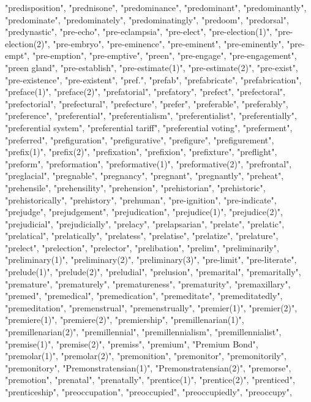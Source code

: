 "predisposition",
"prednisone",
"predominance",
"predominant",
"predominantly",
"predominate",
"predominately",
"predominatingly",
"predoom",
"predorsal",
"predynastic",
"pre-echo",
"pre-eclampsia",
"pre-elect",
"pre-election(1)",
"pre-election(2)",
"pre-embryo",
"pre-eminence",
"pre-eminent",
"pre-eminently",
"pre-empt",
"pre-emption",
"pre-emptive",
"preen",
"pre-engage",
"pre-engagement",
"preen gland",
"pre-establish",
"pre-estimate(1)",
"pre-estimate(2)",
"pre-exist",
"pre-existence",
"pre-existent",
"pref.",
"prefab",
"prefabricate",
"prefabrication",
"preface(1)",
"preface(2)",
"prefatorial",
"prefatory",
"prefect",
"prefectoral",
"prefectorial",
"prefectural",
"prefecture",
"prefer",
"preferable",
"preferably",
"preference",
"preferential",
"preferentialism",
"preferentialist",
"preferentially",
"preferential system",
"preferential tariff",
"preferential voting",
"preferment",
"preferred",
"prefiguration",
"prefigurative",
"prefigure",
"prefigurement",
"prefix(1)",
"prefix(2)",
"prefixation",
"prefixion",
"prefixture",
"preflight",
"preform",
"preformation",
"preformative(1)",
"preformative(2)",
"prefrontal",
"preglacial",
"pregnable",
"pregnancy",
"pregnant",
"pregnantly",
"preheat",
"prehensile",
"prehensility",
"prehension",
"prehistorian",
"prehistoric",
"prehistorically",
"prehistory",
"prehuman",
"pre-ignition",
"pre-indicate",
"prejudge",
"prejudgement",
"prejudication",
"prejudice(1)",
"prejudice(2)",
"prejudicial",
"prejudicially",
"prelacy",
"prelapsarian",
"prelate",
"prelatic",
"prelatical",
"prelatically",
"prelatess",
"prelatise",
"prelatize",
"prelature",
"prelect",
"prelection",
"prelector",
"prelibation",
"prelim",
"preliminarily",
"preliminary(1)",
"preliminary(2)",
"preliminary(3)",
"pre-limit",
"pre-literate",
"prelude(1)",
"prelude(2)",
"preludial",
"prelusion",
"premarital",
"premaritally",
"premature",
"prematurely",
"prematureness",
"prematurity",
"premaxillary",
"premed",
"premedical",
"premedication",
"premeditate",
"premeditatedly",
"premeditation",
"premenstrual",
"premenstrually",
"premier(1)",
"premier(2)",
"premiere(1)",
"premiere(2)",
"premiership",
"premillenarian(1)",
"premillenarian(2)",
"premillennial",
"premillennialism",
"premillennialist",
"premise(1)",
"premise(2)",
"premiss",
"premium",
"Premium Bond",
"premolar(1)",
"premolar(2)",
"premonition",
"premonitor",
"premonitorily",
"premonitory",
"Premonstratensian(1)",
"Premonstratensian(2)",
"premorse",
"premotion",
"prenatal",
"prenatally",
"prentice(1)",
"prentice(2)",
"prenticed",
"prenticeship",
"preoccupation",
"preoccupied",
"preoccupiedly",
"preoccupy",

